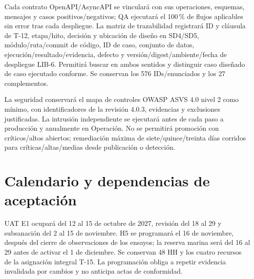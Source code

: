 
Cada contrato OpenAPI/AsyncAPI se vinculará con sus operaciones, esquemas, mensajes y casos positivos/negativos; QA ejecutará el 100\,\% de flujos aplicables sin error tras cada despliegue. La matriz de trazabilidad registrará ID y cláusula de T-12, etapa/hito, decisión y ubicación de diseño en SD4/SD5, módulo/ruta/commit de código, ID de caso, conjunto de datos, ejecución/resultado/evidencia, defecto y versión/digest/ambiente/fecha de despliegue LIB-6. Permitirá buscar en ambos sentidos y distinguir caso diseñado de caso ejecutado conforme. Se conservan los 576 IDs/enunciados y los 27 complementos. \parencite[sec.~9.2.4]{sd9-sd9}

La seguridad conservará el mapa de controles OWASP ASVS 4.0 nivel 2 como mínimo, con identificadores de la revisión 4.0.3, evidencias y exclusiones justificadas. La intrusión independiente se ejecutará antes de cada paso a producción y anualmente en Operación. No se permitirá promoción con críticos/altos abiertos; remediación máxima de siete/quince/treinta días corridos para críticas/altas/medias desde publicación o detección. \parencites{sd9-asvs}[RT-11.04/20; sec.~11.5]{sd9-bt}

\section{Calendario y dependencias de aceptación}
UAT E1 ocupará del 12 al 15 de octubre de 2027, revisión del 18 al 29 y subsanación del 2 al 15 de noviembre. H5 se programará el 16 de noviembre, después del cierre de observaciones de los ensayos; la reserva marina será del 16 al 29 antes de activar el 1 de diciembre. Se conservan 48 HH y los cuatro recursos de la asignación integral T-15. La programación obliga a repetir evidencia invalidada por cambios y no anticipa actas de conformidad. \parencites{sd9-t15}[arts.~17--18]{sd9-ba}

